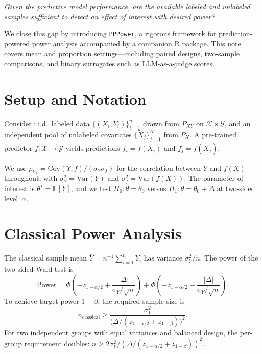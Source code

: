 \documentclass[11pt]{article}
\newcommand{\E}{\mathbb{E}}
\newcommand{\Var}{\mathrm{Var}}
\newcommand{\Cov}{\mathrm{Cov}}
\newcommand{\wt}{\widetilde}
\begin{document}
\begin{tcolorbox}
\emph{Given the predictive model performance, are the available labeled
and unlabeled samples sufficient to detect an effect of interest with
desired power?}
\end{tcolorbox}

We close this gap by introducing \texttt{PPPower}, a rigorous framework
for prediction-powered power analysis accompanied by a companion R
package.  This note covers mean and proportion settings---including
paired designs, two-sample comparisons, and binary surrogates such as
LLM-as-a-judge scores.

\section{Setup and Notation}
\label{sec:notation}

Consider i.i.d.\ labeled data $\{(X_i,Y_i)\}_{i=1}^{n}$ drawn from
$P_{XY}$ on $\mathcal{X}\times\mathcal{Y}$, and an independent pool of
unlabeled covariates $\{\wt X_j\}_{j=1}^{N}$ from $P_X$.  A
pre-trained predictor $f:\mathcal{X}\to\mathcal{Y}$ yields predictions
$f_i = f(X_i)$ and $\wt f_j = f(\wt X_j)$.

We use $\rho_{Yf} = \Cov(Y,f)/(\sigma_Y\sigma_f)$ for the correlation
between $Y$ and $f(X)$ throughout, with $\sigma_Y^2 = \Var(Y)$ and
$\sigma_f^2 = \Var(f(X))$.  The parameter of interest is
$\theta^\star = \E[Y]$, and we test $H_0:\theta = \theta_0$ versus
$H_1:\theta = \theta_0 + \Delta$ at two-sided level~$\alpha$.

\section{Classical Power Analysis}
\label{sec:classical}

The classical sample mean $\bar Y = n^{-1}\sum_{i=1}^n Y_i$ has
variance $\sigma_Y^2/n$.  The power of the two-sided Wald test is
\begin{equation}\label{eq:classical-power}
\text{Power} = \Phi\!\left(-z_{1-\alpha/2} +
  \frac{|\Delta|}{\sigma_Y/\sqrt{n}}\right) +
  \Phi\!\left(-z_{1-\alpha/2} -
  \frac{|\Delta|}{\sigma_Y/\sqrt{n}}\right).
\end{equation}
To achieve target power $1-\beta$, the required sample size is
\begin{equation}\label{eq:classical-n}
n_{\text{classical}} \ge
  \frac{\sigma_Y^2}{\bigl(\Delta/(z_{1-\alpha/2}+z_{1-\beta})\bigr)^2}.
\end{equation}
For two independent groups with equal variances and balanced design, the
per-group requirement doubles:
$n \ge 2\sigma_Y^2 / (\Delta/(z_{1-\alpha/2}+z_{1-\beta}))^2$.
\end{document}
